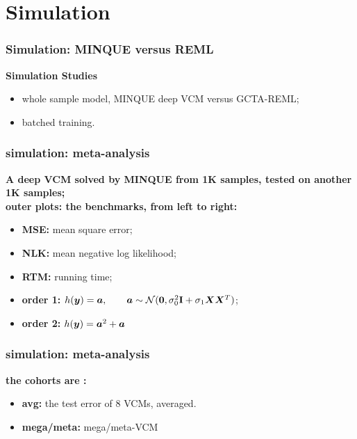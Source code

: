 \documentclass{beamer}
\begin{document}
\section{Simulation}
\begin{frame}
  \frametitle{Simulation: MINQUE versus REML} %
  \centering
  \Large{\textbf{Simulation Studies}}
  \normalsize
  \begin{itemize}
  \item whole sample model, MINQUE deep VCM versus GCTA-REML;
  \item batched training.
  \end{itemize}
\end{frame}
\begin{frame}\frametitle{simulation: meta-analysis}
  \textbf{A deep VCM solved by MINQUE from 1K samples, tested on another 1K samples;} \\
  {\color{blue}\textbf{outer plots: the benchmarks, from left to right:}}
  \begin{itemize}
  \item \textbf{MSE:} mean square error;
  \item \textbf{NLK:} mean negative log likelihood;
  \item \textbf{RTM:} running time;
  \end{itemize}
  \begin{itemize}
  \item \textbf{order 1:} $h({\bm{y}})={\bm{a}}, \qquad {\bm{a}} \sim \mathcal{N}(\bm{0}, \sigma_0^2\textbf{I} + \sigma_1{\bm{X}}{\bm{X}}^T)$;
  \item \textbf{order 2:} $h({\bm{y}})={\bm{a}}^2+{\bm{a}}$
  \end{itemize}
\end{frame}
\begin{frame} \frametitle{simulation: meta-analysis}
  \textbf{the cohorts are \color{blue}{homogeneous}:} \\
  \textbf{\color{blue}{inner plot: strategies, from left to right:}}
  \begin{itemize}
  \item \textbf{avg:} the test error of 8 VCMs, averaged.
  \item \textbf{mega/meta:} mega/meta-VCM
  \end{itemize}
\end{frame}
\end{document}
